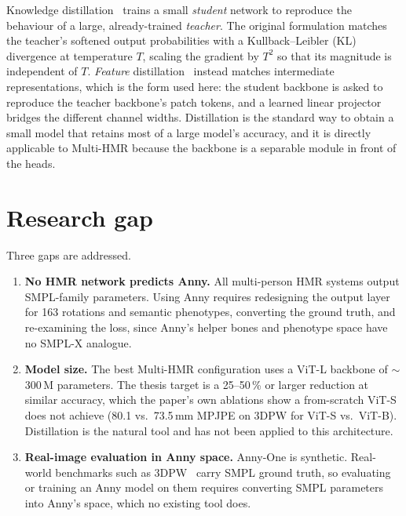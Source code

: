 Knowledge distillation~\cite{hinton2015distilling} trains a small
\emph{student} network to reproduce the behaviour of a large, already-trained
\emph{teacher}. The original formulation matches the teacher's softened
output probabilities with a Kullback--Leibler (KL) divergence at temperature
$T$, scaling the gradient by $T^2$ so that its magnitude is independent of
$T$. \emph{Feature} distillation~\cite{romero2015fitnets} instead matches
intermediate representations, which is the form used here: the student
backbone is asked to reproduce the teacher backbone's patch tokens, and a
learned linear projector bridges the different channel widths. Distillation
is the standard way to obtain a small model that retains most of a large
model's accuracy, and it is directly applicable to Multi-HMR because the
backbone is a separable module in front of the heads.

\section{Research gap}

Three gaps are addressed.
\begin{enumerate}
  \item \textbf{No HMR network predicts Anny.} All multi-person HMR systems
        output SMPL-family parameters. Using Anny requires redesigning the
        output layer for 163 rotations and semantic phenotypes, converting the
        ground truth, and re-examining the loss, since Anny's helper bones and
        phenotype space have no SMPL-X analogue.
  \item \textbf{Model size.} The best Multi-HMR configuration uses a ViT-L
        backbone of $\sim$300\,M parameters. The thesis target is a
        25--50\,\% or larger reduction at similar accuracy, which the paper's
        own ablations show a from-scratch ViT-S does not achieve (80.1 vs.\
        73.5\,mm MPJPE on 3DPW for ViT-S vs.\ ViT-B). Distillation is the
        natural tool and has not been applied to this architecture.
  \item \textbf{Real-image evaluation in Anny space.} Anny-One is synthetic.
        Real-world benchmarks such as 3DPW~\cite{vonmarcard2018_3dpw} carry
        SMPL ground truth, so evaluating or training an Anny model on them
        requires converting SMPL parameters into Anny's space, which no
        existing tool does.
\end{enumerate}

